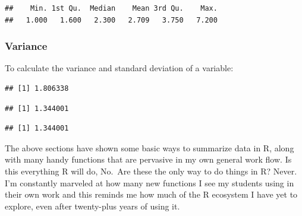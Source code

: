 \documentclass[
]{book}
\newenvironment{Shaded}{\begin{snugshade}}{\end{snugshade}}
\newcommand{\AttributeTok}[1]{\textcolor[rgb]{0.77,0.63,0.00}{#1}}
\newcommand{\CommentTok}[1]{\textcolor[rgb]{0.56,0.35,0.01}{\textit{#1}}}
\newcommand{\ConstantTok}[1]{\textcolor[rgb]{0.00,0.00,0.00}{#1}}
\newcommand{\FunctionTok}[1]{\textcolor[rgb]{0.00,0.00,0.00}{#1}}
\newcommand{\NormalTok}[1]{#1}
\newcommand{\SpecialCharTok}[1]{\textcolor[rgb]{0.00,0.00,0.00}{#1}}
\begin{document}
\begin{verbatim}
##    Min. 1st Qu.  Median    Mean 3rd Qu.    Max. 
##   1.000   1.600   2.300   2.709   3.750   7.200
\end{verbatim}

\hypertarget{variance}{%
\subsubsection{Variance}\label{variance}}

To calculate the variance and standard deviation of a variable:

\begin{Shaded}
\end{Shaded}

\begin{verbatim}
## [1] 1.806338
\end{verbatim}

\begin{Shaded}
\end{Shaded}

\begin{verbatim}
## [1] 1.344001
\end{verbatim}

\begin{Shaded}
\end{Shaded}

\begin{verbatim}
## [1] 1.344001
\end{verbatim}

The above sections have shown some basic ways to summarize data in R,
along with many handy functions that are pervasive in my own general
work flow. Is this everything R will do, No.~Are these the only way to
do things in R? Never. I'm constantly marveled at how many new functions
I see my students using in their own work and this reminds me how much
of the R ecosystem I have yet to explore, even after twenty-plus years
of using it.
\end{document}
